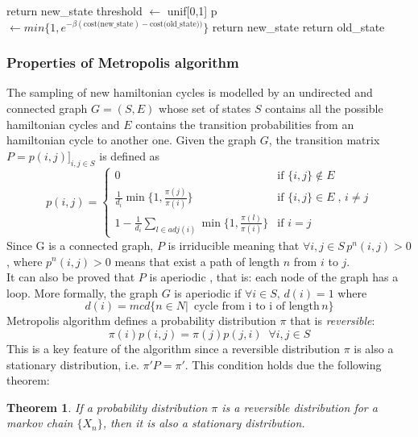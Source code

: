 \documentclass{article}
\newtheorem{theorem}{Theorem}
\begin{document}
\begin{algorithm}[H]
    \begin{algorithmic}[1]
      	\State return new\_state
      	\EndIf
        \State threshold $\leftarrow$ unif[0,1]
        \State p  $\leftarrow min\{1,e^{- \beta (\text{cost(new\_state}) - \text{cost(old\_state}))} \}$ 
        	\State return new\_state
        \Else
        	\State return old\_state
        \EndIf
       \EndFunction
\end{algorithmic}
\end{algorithm}
\noindent
\subsubsection{Properties of Metropolis algorithm}
The sampling of new hamiltonian cycles is modelled by an undirected and connected graph $G = (S,E)$ whose set of states $S$ contains all the possible hamiltonian cycles and $E$ contains the transition probabilities from an hamiltonian cycle to another one. Given the graph $G$, the transition matrix $P=p(i,j)]_{i,j\in S}$ is defined as
\begin{equation}
p(i,j) =  \begin{cases} 
	0\, & \mbox{if } \{i,j\} \notin E  \\ 
	\frac{1}{d_i} \min\{1,\frac{\pi(j)}{\pi(i)}\} & \mbox{if }  \{i,j\} \in E \;,\, i \neq j\\
	1-\frac{1}{d_i} \sum_{l \in adj(i)} \min\{1,\frac{\pi(l)}{\pi(i)}\}  & \mbox{if }  i = j 
\end{cases}
\end{equation}
Since G is a connected graph, $P$ is irriducible meaning that $\forall i,j \in S \, p^n(i,j) > 0$, where $p^n(i,j) > 0$ means that exist a path of length $n$ from $i$ to $j$.\\
It can also be proved that $P$ is aperiodic \cite{metropolis}, that is: each node of the graph has a loop. More formally, the graph $G$ is aperiodic if $\forall i \in S, \,d(i)  = 1$ where
\begin{equation}
d(i) = mcd \{n \in N | \, \text{ cycle from i to i of length} \, n\}
\end{equation}
Metropolis algorithm defines a probability distribution $\pi$ that is \textit{reversible}:
\begin{equation}
	\pi(i)p(i,j) = \pi(j)p(j,i) \;\; \forall i,j \in S
\end{equation}
This is a key feature of the algorithm since a reversible distribution $\pi$ is also a stationary distribution, i.e. $\pi'P=\pi'$. This condition holds due the following theorem: 
\begin{theorem}
If a probability distribution $\pi$ is a reversible distribution for a markov chain $ \{X_n\} $, then it is also a stationary distribution.
\end{theorem}
\end{document}
